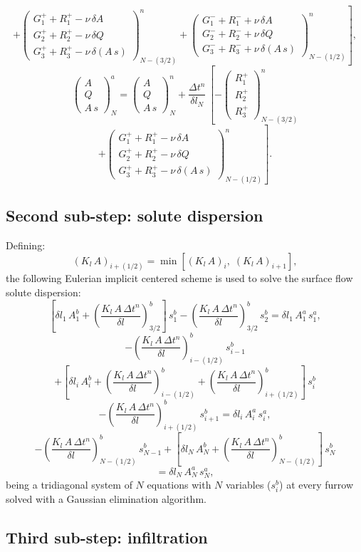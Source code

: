 \documentclass[review,authoryear]{elsarticle}
\newcommand{\eq}[2]{\begin{equation}\label{#2}#1\end{equation}}
\newcommand{\PA}[1] {\left(#1\right)}
\newcommand{\C}[1] {\left[#1\right]}
\newcommand{\MATRIX}[2] {\PA{\begin{array}{#1}#2\end{array}}}
\newcommand{\IR}{_{i+(1/2)}}
\newcommand{\IL}{_{i-(1/2)}}
\begin{document}
\[
	\left.+\MATRIX{c}{G_1^++R_1^+-\nu\,\delta A\\
	G_2^++R_2^+-\nu\,\delta Q\\
	G_3^++R_3^+-\nu\,\delta(A\,s)}_{N-(3/2)}^n
	+\MATRIX{c}{G_1^-+R_1^-+\nu\,\delta A\\
	G_2^-+R_2^-+\nu\,\delta Q\\
	G_3^-+R_3^-+\nu\,\delta(A\,s)}_{N-(1/2)}^n\right],
\]
\[
	\MATRIX{c}{A\\Q\\A\,s}_N^a=\MATRIX{c}{A\\Q\\A\,s}_N^n
	+\frac{\Delta t^n}{\delta l_N}\,\left[
	-\MATRIX{c}{R_1^+\\R_2^+\\R_3^+}_{N-(3/2)}^n\right.
\]
\eq
{
	\left.+\MATRIX{c}{G_1^++R_1^+-\nu\,\delta A\\
	G_2^++R_2^+-\nu\,\delta Q\\
	G_3^++R_3^+-\nu\,\delta(A\,s)}_{N-(1/2)}^n\right].
}{EqSchemeTVDBoundary}

\subsection{Second sub-step: solute dispersion}

Defining:
\eq{\PA{K_l\,A}\IR=\min\C{\PA{K_l\,A}_i,\;\PA{K_l\,A}_{i+1}},}{EqKlA}
the following Eulerian implicit centered scheme is used to solve the surface flow
solute dispersion:
\[
	\C{\delta l_1\,A_1^b+\PA{\frac{K_l\,A\,\Delta t^n}{\delta l}}_{3/2}^b}
	\,s_1^b-\PA{\frac{K_l\,A\,\Delta t^n}{\delta l}}_{3/2}^b\,s_2^b
	=\delta l_1\,A_1^a\,s_1^a,
\]
\[-\PA{\frac{K_l\,A\,\Delta t^n}{\delta l}}\IL^b\,s_{i-1}^b\]
\[
	+\C{\delta l_i\,A_i^b+\PA{\frac{K_l\,A\,\Delta t^n}{\delta l}}\IL^b
	+\PA{\frac{K_l\,A\,\Delta t^n}{\delta l}}\IR^b}\,s_i^b
\]
\[
	-\PA{\frac{K_l\,A\,\Delta t^n}{\delta l}}\IR^b\,s_{i+1}^b
	=\delta l_i\,A_i^a\,s_i^a,
\]
\[
	-\PA{\frac{K_l\,A\,\Delta t^n}{\delta l}}_{N-(1/2)}^b\,s_{N-1}^b
	+\C{\delta l_N\,A_N^b+
	\PA{\frac{K_l\,A\,\Delta t^n}{\delta l}}_{N-(1/2)}^b}\,s_N^b
\]
\eq
{
	=\delta l_N\,A_N^a\,s_N^a,
}{EqSchemeDispersion}
being a tridiagonal system of $N$ equations with $N$ variables ($s_i^b$) at
every furrow solved with a Gaussian elimination algorithm.

\subsection{Third sub-step: infiltration}
\end{document}
